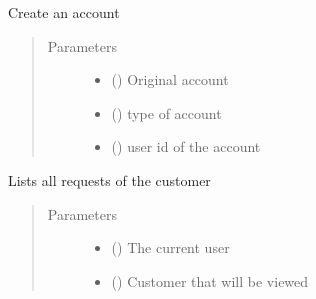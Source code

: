\documentclass[letterpaper,10pt,english]{sphinxmanual}
\begin{document}
\begin{fulllineitems}
\label{\detokenize{bank:bank.terminalFunctions.make}}
Create an account
\begin{quote}\begin{description}
\item[{Parameters}] \leavevmode\begin{itemize}
\item {} 
 ({\hyperref[\detokenize{bank:bank.customer.Customer}]{}}) \textendash{} Original account

\item {} 
 () \textendash{} type of account

\item {} 
 () \textendash{} user id of the account

\end{itemize}

\end{description}\end{quote}

\end{fulllineitems}


\begin{fulllineitems}
\label{\detokenize{bank:bank.terminalFunctions.requests}}
Lists all requests of the customer
\begin{quote}\begin{description}
\item[{Parameters}] \leavevmode\begin{itemize}
\item {} 
 () \textendash{} The current user

\item {} 
 () \textendash{} Customer that will be viewed

\end{itemize}

\end{description}\end{quote}

\end{fulllineitems}
\end{document}
